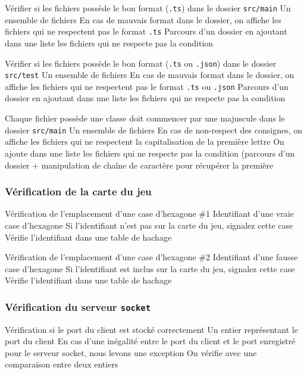 \mytest
{Vérifier si les fichiers possède le bon format (\texttt{.ts}) dans le dossier \texttt{src/main}}
{Un ensemble de fichiers}
{En cas de mauvais format dans le dossier, on affiche les fichiers qui ne respectent pas le format \texttt{.ts}}
{Parcours d'un dossier en ajoutant dans une liste les fichiers qui ne respecte pas la condition}

\mytest
{Vérifier si les fichiers possède le bon format (\texttt{.ts} ou \texttt{.json}) dans le dossier \texttt{src/test}}
{Un ensemble de fichiers}
{En cas de mauvais format dans le dossier, on affiche les fichiers qui ne respectent pas le format \texttt{.ts} ou \texttt{.json}}
{Parcours d'un dossier en ajoutant dans une liste les fichiers qui ne respecte pas la condition}

\mytest
{Chaque fichier possède une classe doit commencer par une majuscule dans le dossier \texttt{src/main}}
{Un ensemble de fichiers}
{En cas de non-respect des consignes, on affiche les fichiers qui ne respectent la capitalisation de la première lettre}
{On ajoute dans une liste les fichiers qui ne respecte pas la condition (parcours d'un dossier + manipulation de chaîne de caractère pour récupérer la première}

\subsubsection{Vérification de la carte du jeu}

\mytest
{Vérification de l'emplacement d'une case d'hexagone \#1}
{Identifiant d'une vraie case d'hexagone}
{Si l'identifiant n'est pas sur la carte du jeu, signalez cette case}
{Vérifie l'identifiant dans une table de hachage}

\mytest
{Vérification de l'emplacement d'une case d'hexagone \#2}
{Identifiant d'une fausse case d'hexagone}
{Si l'identifiant est inclus sur la carte du jeu, signalez cette case}
{Vérifie l'identifiant dans une table de hachage}

\subsubsection{Vérification du serveur {\tt socket}}

\mytest
{Vérification si le port du client est stocké correctement}
{Un entier représentant le port du client}
{En cas d'une inégalité entre le port du client et le port enregistré pour le serveur socket, nous levons une exception}
{On vérifie avec une comparaison entre deux entiers}

